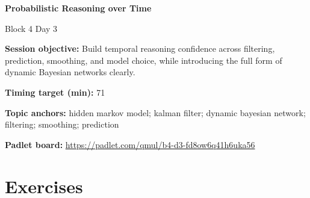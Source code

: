 \documentclass[11pt]{article}
\begin{document}
\begin{center}\LARGE\bfseries Probabilistic Reasoning over Time\end{center}

\begin{center}\large Block 4 Day 3\end{center}

\begin{tcolorbox}[colback=MidnightBlue!4,colframe=MidnightBlue,title={Session Overview},fonttitle=\bfseries,breakable]
\textbf{Session objective:} Build temporal reasoning confidence across filtering, prediction, smoothing, and model choice, while introducing the full form of dynamic Bayesian networks clearly.

\textbf{Timing target (min):} 71

\textbf{Topic anchors:} hidden markov model; kalman filter; dynamic bayesian network; filtering; smoothing; prediction

\textbf{Padlet board:} \url{https://padlet.com/qmul/b4-d3-fd8ow6q41h6uka56}
\end{tcolorbox}

\section*{Exercises}
\end{document}
